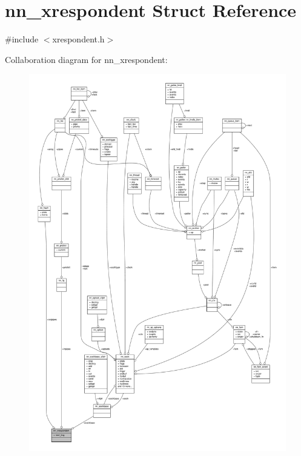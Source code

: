\hypertarget{structnn__xrespondent}{}\section{nn\+\_\+xrespondent Struct Reference}
\label{structnn__xrespondent}


{\ttfamily \#include $<$xrespondent.\+h$>$}



Collaboration diagram for nn\+\_\+xrespondent\+:\nopagebreak
\begin{figure}[H]
\begin{center}
\leavevmode
\includegraphics[width=350pt]{structnn__xrespondent__coll__graph}
\end{center}
\end{figure}
